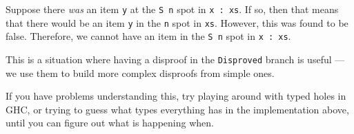 \documentclass[]{article}
\newenvironment{Shaded}{}{}
\newcommand{\CommentTok}[1]{\textcolor[rgb]{0.38,0.63,0.69}{\textit{#1}}}
\newcommand{\DataTypeTok}[1]{\textcolor[rgb]{0.56,0.13,0.00}{#1}}
\newcommand{\FunctionTok}[1]{\textcolor[rgb]{0.02,0.16,0.49}{#1}}
\newcommand{\KeywordTok}[1]{\textcolor[rgb]{0.00,0.44,0.13}{\textbf{#1}}}
\newcommand{\NormalTok}[1]{#1}
\newcommand{\OtherTok}[1]{\textcolor[rgb]{0.00,0.44,0.13}{#1}}
\begin{document}
\begin{enumerate}
\begin{itemize}
    Suppose there \emph{was} an item \texttt{y} at the
    \texttt{\textquotesingle{}S\ n} spot in \texttt{x\ \textquotesingle{}:\ xs}.
    If so, then that means that there would be an item \texttt{y} in the
    \texttt{n} spot in \texttt{xs}. However, this was found to be false.
    Therefore, we cannot have an item in the \texttt{\textquotesingle{}S\ n}
    spot in \texttt{x\ \textquotesingle{}:\ xs}.

    This is a situation where having a disproof in the \texttt{Disproved} branch
    is useful --- we use them to build more complex disproofs from simple ones.
  \end{itemize}

\begin{Shaded}
\end{Shaded}

  If you have problems understanding this, try playing around with typed holes
  in GHC, or trying to guess what types everything has in the implementation
  above, until you can figure out what is happening when.
\end{enumerate}
\end{document}
